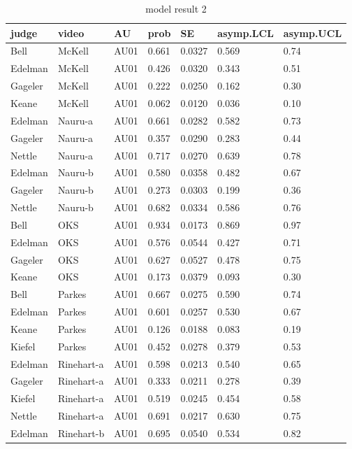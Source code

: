 \documentclass{monashthesis}
\begin{document}
\begin{center}
\begin{longtable}{lllllll}
\caption{model result 2}\\
\toprule
judge & video & AU & prob & SE & asymp.LCL & asymp.UCL \\
\midrule
\endhead
\bottomrule
\endfoot
Bell & McKell & AU01 & 0.661 & 0.0327 & 0.569 & 0.74 \\
Edelman & McKell & AU01 & 0.426 & 0.0320 & 0.343 & 0.51 \\
Gageler & McKell & AU01 & 0.222 & 0.0250 & 0.162 & 0.30 \\
Keane & McKell & AU01 & 0.062 & 0.0120 & 0.036 & 0.10 \\
Edelman & Nauru-a & AU01 & 0.661 & 0.0282 & 0.582 & 0.73 \\
Gageler & Nauru-a & AU01 & 0.357 & 0.0290 & 0.283 & 0.44 \\
Nettle & Nauru-a & AU01 & 0.717 & 0.0270 & 0.639 & 0.78 \\
Edelman & Nauru-b & AU01 & 0.580 & 0.0358 & 0.482 & 0.67 \\
Gageler & Nauru-b & AU01 & 0.273 & 0.0303 & 0.199 & 0.36 \\
Nettle & Nauru-b & AU01 & 0.682 & 0.0334 & 0.586 & 0.76 \\
Bell & OKS & AU01 & 0.934 & 0.0173 & 0.869 & 0.97 \\
Edelman & OKS & AU01 & 0.576 & 0.0544 & 0.427 & 0.71 \\
Gageler & OKS & AU01 & 0.627 & 0.0527 & 0.478 & 0.75 \\
Keane & OKS & AU01 & 0.173 & 0.0379 & 0.093 & 0.30 \\
Bell & Parkes & AU01 & 0.667 & 0.0275 & 0.590 & 0.74 \\
Edelman & Parkes & AU01 & 0.601 & 0.0257 & 0.530 & 0.67 \\
Keane & Parkes & AU01 & 0.126 & 0.0188 & 0.083 & 0.19 \\
Kiefel & Parkes & AU01 & 0.452 & 0.0278 & 0.379 & 0.53 \\
Edelman & Rinehart-a & AU01 & 0.598 & 0.0213 & 0.540 & 0.65 \\
Gageler & Rinehart-a & AU01 & 0.333 & 0.0211 & 0.278 & 0.39 \\
Kiefel & Rinehart-a & AU01 & 0.519 & 0.0245 & 0.454 & 0.58 \\
Nettle & Rinehart-a & AU01 & 0.691 & 0.0217 & 0.630 & 0.75 \\
Edelman & Rinehart-b & AU01 & 0.695 & 0.0540 & 0.534 & 0.82 \\

\end{longtable}
\end{center}
\end{document}
